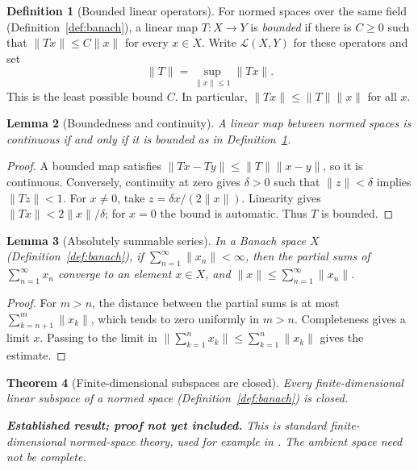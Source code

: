 \documentclass[11pt,a4paper]{article}
\theoremstyle{definition}
\newtheorem{definition}{Definition}[section]
\theoremstyle{plain}
\newtheorem{theorem}[definition]{Theorem}
\newtheorem{lemma}[definition]{Lemma}
\newcommand{\norm}[1]{\lVert #1\rVert}
\begin{document}
\begin{definition}[Bounded linear operators]\label{def:operator}
For normed spaces over the same field (Definition~\ref{def:banach}), a
linear map $T:X\to Y$ is \emph{bounded} if there is $C\ge0$ such that
$\norm{Tx}\le C\norm{x}$ for every $x\in X$.
Write $\mathcal L(X,Y)$ for these operators and set
\[
 \norm{T}=\sup_{\norm{x}\le1}\norm{Tx}.
\]
This is the least possible bound $C$. In particular,
$\norm{Tx}\le\norm{T}\norm{x}$ for all $x$.
\end{definition}

\begin{lemma}[Boundedness and continuity]\label{lem:continuity}
A linear map between normed spaces is continuous if and only if it is
bounded as in Definition~\ref{def:operator}.
\end{lemma}
\begin{proof}
A bounded map satisfies
$\norm{Tx-Ty}\le\norm{T}\norm{x-y}$, so it is continuous.
Conversely, continuity at zero gives $\delta>0$ such that
$\norm{z}<\delta$ implies $\norm{Tz}<1$.
For $x\ne0$, take $z=\delta x/(2\norm{x})$. Linearity gives
$\norm{Tx}<2\norm{x}/\delta$; for $x=0$ the bound is automatic.
Thus $T$ is bounded.
\end{proof}

\begin{lemma}[Absolutely summable series]\label{lem:series}
In a Banach space $X$ (Definition~\ref{def:banach}), if
$\sum_{n=1}^{\infty}\norm{x_n}<\infty$, then the partial sums of
$\sum_{n=1}^{\infty}x_n$ converge to an element $x\in X$, and
$\norm{x}\le\sum_{n=1}^{\infty}\norm{x_n}$.
\end{lemma}
\begin{proof}
For $m>n$, the distance between the partial sums is at most
$\sum_{k=n+1}^{m}\norm{x_k}$, which tends to zero uniformly in $m>n$.
Completeness gives a limit $x$. Passing to the limit in
$\norm{\sum_{k=1}^{n}x_k}\le\sum_{k=1}^{n}\norm{x_k}$ gives the estimate.
\end{proof}

\begin{theorem}[Finite-dimensional subspaces are closed]\label{thm:finite-dimensional}
Every finite-dimensional linear subspace of a normed space
(Definition~\ref{def:banach}) is closed.

\normalfont\smallskip
\textbf{Established result; proof not yet included.}
This is standard finite-dimensional normed-space theory, used for example in
\cite[solution to Exercise 2.4]{belton}. The ambient space need not be complete.
\end{theorem}
\end{document}
